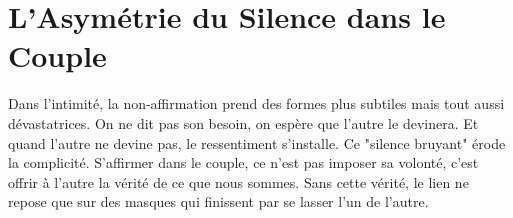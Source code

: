 \section{L'Asymétrie du Silence dans le Couple}
Dans l'intimité, la non-affirmation prend des formes plus subtiles mais tout aussi dévastatrices. On ne dit pas son besoin, on espère que l'autre le devinera. Et quand l'autre ne devine pas, le ressentiment s'installe. Ce "silence bruyant" érode la complicité. S'affirmer dans le couple, ce n'est pas imposer sa volonté, c'est offrir à l'autre la vérité de ce que nous sommes. Sans cette vérité, le lien ne repose que sur des masques qui finissent par se lasser l'un de l'autre.
